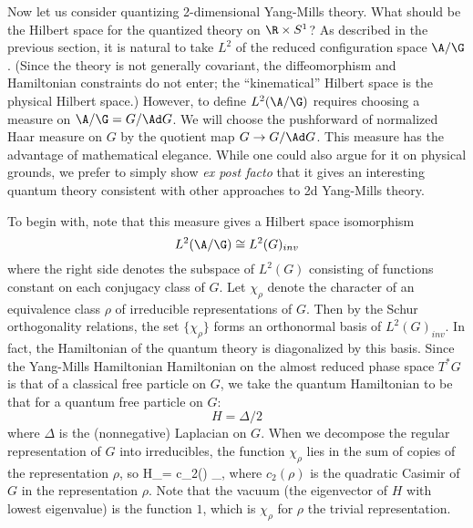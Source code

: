 Now let us consider quantizing 2-dimensional Yang-Mills theory.
What should be the Hilbert space for the quantized theory on
$\R \times S^1$?   As described in the previous section, it is natural to
take $L^2$ of the reduced configuration space $\A/\G$.  (Since the theory
is not generally covariant, the diffeomorphism and Hamiltonian constraints
do not enter; the ``kinematical'' Hilbert space is the physical Hilbert
space.)  However, to define $L^2(\A/\G)$ requires
choosing a measure on $\A/\G = G/\Ad G$.   We will choose the
pushforward of normalized Haar measure on $G$ by the quotient map $G \to
G/\Ad G$.  This measure has the advantage of mathematical elegance.
While one could also argue for it on physical grounds, we prefer to
simply show {\it ex post facto} that it gives an interesting quantum theory
consistent with other approaches to 2d Yang-Mills theory.

To begin with, note that this measure gives a Hilbert space isomorphism
\[        L^2(\A/\G) \cong L^2(G)_{inv} \]
where the right side denotes the subspace of $L^2(G)$ consisting of
functions constant on each conjugacy class of $G$.   Let $\chi_\rho$ denote
the character of an equivalence class $\rho$ of irreducible representations
of $G$.   Then by the Schur orthogonality relations, the set
$\{\chi_\rho\}$ forms an orthonormal basis of $L^2(G)_{inv}$. In fact, the
Hamiltonian of the quantum theory is diagonalized by this basis.   Since
the Yang-Mills Hamiltonian Hamiltonian on the almost reduced phase space
$T^\ast G$ is that of a classical free particle on $G$,  we take the
quantum Hamiltonian to be that for a quantum free particle on $G$:
\[        H = \Delta/2  \]
where $\Delta$ is the (nonnegative) Laplacian on $G$.
When we decompose the regular representation of $G$ into irreducibles,  the
function $\chi_\rho$ lies in the sum of copies of the representation
$\rho$, so
\ba              H\chi_\rho = \hf c_2(\rho) \chi_\rho ,\label{Ham0} \ea
where $c_2(\rho)$ is the quadratic Casimir of $G$ in the
representation $\rho$. Note that the vacuum (the eigenvector of $H$ with
lowest eigenvalue) is the function $1$, which is $\chi_\rho$ for $\rho$ the
trivial representation.

